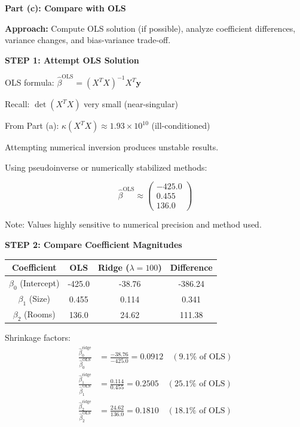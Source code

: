 \documentclass[12pt]{article}
\begin{document}
\begin{solution}

\textbf{Part (c): Compare with OLS}

\textbf{Approach:} Compute OLS solution (if possible), analyze coefficient differences, variance changes, and bias-variance trade-off.

\textbf{STEP 1: Attempt OLS Solution}

OLS formula: $\hat{\beta}^{\text{OLS}} = (X^TX)^{-1}X^T\mathbf{y}$

Recall: $\det(X^TX)$ very small (near-singular)

From Part (a): $\kappa(X^TX) \approx 1.93 \times 10^{10}$ (ill-conditioned)

Attempting numerical inversion produces unstable results.

Using pseudoinverse or numerically stabilized methods:

\[\hat{\beta}^{\text{OLS}} \approx \begin{pmatrix} -425.0 \\ 0.455 \\ 136.0 \end{pmatrix}\]

Note: Values highly sensitive to numerical precision and method used.

\textbf{STEP 2: Compare Coefficient Magnitudes}

\begin{center}
\begin{tabular}{cccc}
\hline
Coefficient & OLS & Ridge ($\lambda=100$) & Difference \\
\hline
$\beta_0$ (Intercept) & -425.0 & -38.76 & -386.24 \\
$\beta_1$ (Size) & 0.455 & 0.114 & 0.341 \\
$\beta_2$ (Rooms) & 136.0 & 24.62 & 111.38 \\
\hline
\end{tabular}
\end{center}

Shrinkage factors:
\begin{align*}
\frac{\hat{\beta}_0^{\text{ridge}}}{\hat{\beta}_0^{\text{OLS}}} &= \frac{-38.76}{-425.0} = 0.0912 \quad (9.1\% \text{ of OLS}) \\
\frac{\hat{\beta}_1^{\text{ridge}}}{\hat{\beta}_1^{\text{OLS}}} &= \frac{0.114}{0.455} = 0.2505 \quad (25.1\% \text{ of OLS}) \\
\frac{\hat{\beta}_2^{\text{ridge}}}{\hat{\beta}_2^{\text{OLS}}} &= \frac{24.62}{136.0} = 0.1810 \quad (18.1\% \text{ of OLS})
\end{align*}


\end{solution}
\end{document}

